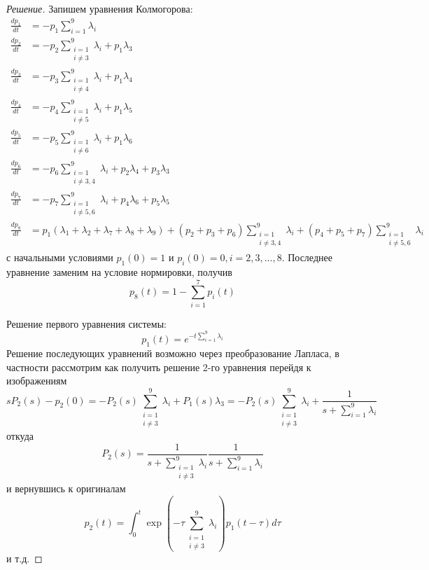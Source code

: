 \documentclass[12pt,a4paper]{article}
\begin{document}
\begin{proof}[Решение]
	Запишем уравнения Колмогорова:
	\begin{align*}
		\frac{d p_1}{d t} &= -p_1 \sum_{i=1}^{9}{\lambda_i} \\
		\frac{d p_2}{d t} &= -p_2 \sum_{\substack{i = 1 \\ i \neq 3}}^{9}{\lambda_i} + p_1 \lambda_3 \\
		\frac{d p_3}{d t} &= -p_3 \sum_{\substack{i = 1 \\ i \neq 4}}^{9}{\lambda_i} + p_1 \lambda_4 \\
		\frac{d p_4}{d t} &= -p_4 \sum_{\substack{i = 1 \\ i \neq 5}}^{9}{\lambda_i} + p_1 \lambda_5 \\
		\frac{d p_5}{d t} &= -p_5 \sum_{\substack{i = 1 \\ i \neq 6}}^{9}{\lambda_i} + p_1 \lambda_6 \\
		\frac{d p_6}{d t} &= -p_6 \sum_{\substack{i = 1 \\ i \neq 3, 4}}^{9}{\lambda_i} + p_2 \lambda_4 + p_3 \lambda_3 \\
		\frac{d p_7}{d t} &= -p_7 \sum_{\substack{i = 1 \\ i \neq 5, 6}}^{9}{\lambda_i} + p_4 \lambda_6 + p_5 \lambda_5 \\
		\frac{d p_8}{d t} &= p_1 (\lambda_1 + \lambda_2 + \lambda_7 + \lambda_8 + \lambda_9) + (p_2 + p_3 + p_6) \sum_{\substack{i = 1 \\ i \neq 3, 4}}^{9}{\lambda_i} + (p_4 + p_5 + p_7) \sum_{\substack{i = 1 \\ i \neq 5, 6}}^{9}{\lambda_i}
	\end{align*}
	с начальными условиями $p_1 (0) = 1$ и $p_i (0) = 0, i = 2, 3, ..., 8$. Последнее уравнение заменим на условие нормировки, получив
	$$p_8 (t) = 1 - \sum\limits_{i=1}^{7}{p_i (t)}$$
	
	Решение первого уравнения системы:
	$$p_1 (t) = e^{-t\sum\limits_{i=1}^{9}{\lambda_i}}$$
	Решение последующих уравнений возможно через преобразование Лапласа, в частности рассмотрим как получить решение 2-го уравнения перейдя к изображениям
	$$s P_2 (s) - p_2 (0) = -P_2 (s) \sum_{\substack{i = 1 \\ i \neq 3}}^{9}{\lambda_i} + P_1 (s) \lambda_3 = -P_2 (s) \sum_{\substack{i = 1 \\ i \neq 3}}^{9}{\lambda_i} + \frac{1}{s + \sum\limits_{i=1}^{9}{\lambda_i}}$$
	откуда
	$$P_2 (s) = \frac{1}{s + \sum\limits_{\substack{i=1 \\ i \neq 3}}^{9}{\lambda_i}} \frac{1}{s + \sum\limits_{i=1}^{9}{\lambda_i}}$$
	и вернувшись к оригиналам
	$$p_2 (t) = \int_{0}^{t}{\exp(-\tau \sum\limits_{\substack{i = 1 \\ i \neq 3}}^{9}{\lambda_i}) p_1 (t - \tau)d\tau}$$
	и т.д.
\end{proof}
\end{document}
